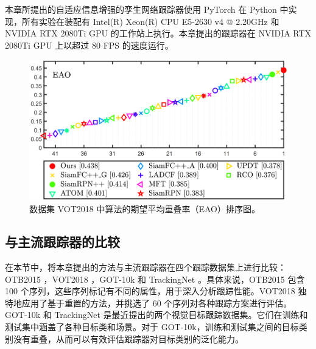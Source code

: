 本章所提出的自适应信息增强的孪生网络跟踪器使用 PyTorch 在 Python 中实现，所有实验在装配有 Intel(R) Xeon(R) CPU E5-2630 v4 @ 2.20GHz
和 NVIDIA RTX 2080Ti GPU 的工作站上执行。本章提出的跟踪器在 NVIDIA RTX 2080Ti GPU 上以超过 80 FPS 的速度运行。

\begin{figure}[t]
    \centering
    \includegraphics[width=1.0\textwidth]{Img/MTP/vot18/vot18_eao.png}
    \caption{数据集 VOT2018 中算法的期望平均重叠率（EAO）排序图。}
    \label{fig:eao}
\end{figure}


\subsection{与主流跟踪器的比较}

在本节中，将本章提出的方法与主流跟踪器在四个跟踪数据集上进行比较：OTB2015 \cite{OTB2015}，VOT2018 \cite{kristan2018sixth}，GOT-10k \cite{GOT-10k} 和 TrackingNet \cite{muller2018trackingnet}。具体来说，OTB2015 \cite{OTB2015} 包含 100 个序列，这些序列标记有不同的属性，用于深入分析跟踪性能。VOT2018 \cite{kristan2018sixth} 独特地应用了基于重置的方法，并挑选了 60 个序列对各种跟踪方案进行评估。GOT-10k \cite{GOT-10k} 和 TrackingNet \cite{muller2018trackingnet} 是最近提出的两个视觉目标跟踪数据集。它们在训练和测试集中涵盖了各种目标类和场景。对于 GOT-10k，训练和测试集之间的目标类别没有重叠，从而可以有效评估跟踪器对目标类别的泛化能力。

